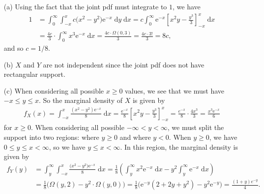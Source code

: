 \documentclass[10pt]{article}
\begin{document}
\begin{itemize}
    \item[(a)] 
    Using the fact that the joint pdf must integrate to \(1\), we have 
    \begin{align*}
        1 &= \int_0^{\infty} \int_{-x}^{x} c \big( x^2 - y^2 \big) \mathrm{e}^{-x} \;\mathrm{d}y \;\mathrm{d}x
        = c \int_0^{\infty} \mathrm{e}^{-x} \left[ x^2y - \frac{y^3}{3} \right]_{-x}^{x} \;\mathrm{d}x \\
        &= \frac{4c}{3} \cdot \int_0^{\infty} x^3 \mathrm{e}^{-x} \;\mathrm{d}x
        = \frac{4c \cdot \Omega(0,3)}{3} 
        = \frac{4c \cdot 3!}{3}
        = 8 c,
    \end{align*}
    and so \(c = 1/8\). 
    \item[(b)] \(X\) and \(Y\) are not independent since the joint pdf does not have rectangular support. 
    \item[(c)] When considering all possible \(x \ge 0\) values, we see that we must have \(-x \le y \le x\). 
    So the marginal density of \(X\) is given by 
    \begin{align*}
        f_X(x) = \int_{-x}^x \frac{(x^2 - y^2)\mathrm{e}^{-x}}{8} \;\mathrm{d}x
        = \frac{\mathrm{e}^{-x}}{8} \left[ x^2y - \frac{y^3}{3} \right]_{-x}^x
        = \frac{e^{-x}}{8} \cdot \frac{4 x^3}{3}
        = \frac{x^3 \mathrm{e}^{-x}}{6}
    \end{align*}
    for \(x \ge 0\). When considering all possible \(-\infty < y < \infty\), we must split the support into two regions: where \(y \ge 0\) and 
    where \(y < 0\). When \(y \ge 0\), we have \(0 \le y \le x < \infty\), so we have \(y \le x < \infty\). In this region, the marginal density 
    is given by 
    \begin{align*}
        f_Y(y) &= \int_y^{\infty} \int_{-x}^{x} \frac{\big( x^2 - y^2 \big) \mathrm{e}^{-x}}{8} \;\mathrm{d}x
        = \frac{1}{8} \left( \int_y^{\infty} x^2 \mathrm{e}^{-x} \;\mathrm{d}x - y^2 \int_y^{\infty} \mathrm{e}^{-x} \;\mathrm{d}x \right) \\
        &= \frac{1}{8} \big( \Omega(y,2) - y^2 \cdot \Omega(y,0) \big)
        = \frac{1}{8} \big( \mathrm{e}^{-y}(2 + 2y + y^2) - y^2\mathrm{e}^{-y} \big)
        = \frac{(1 + y) e^{-y}}{4}.
    \end{align*}

\end{itemize}
\end{document}

